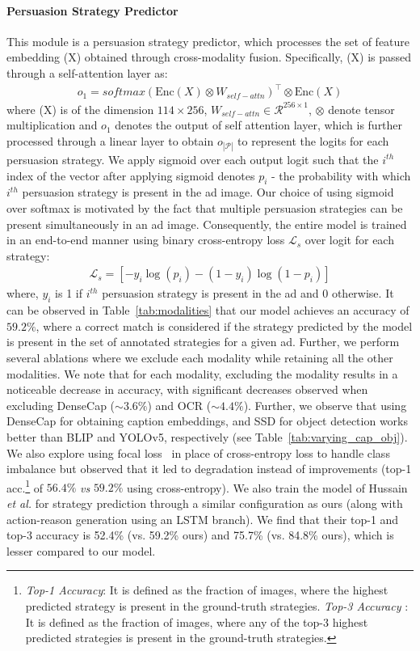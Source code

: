 \paragraph{Persuasion Strategy Predictor} 
This module is a persuasion strategy predictor, which processes the set of feature embedding (X) obtained through cross-modality fusion. Specifically, (X) is passed through a self-attention layer as:
\begin{align}
o_{1} = softmax(\text{Enc}(X) \otimes W_{self-attn})^\intercal \otimes \text{Enc}(X)
\end{align}
where (X) is of the dimension $114\times256$,  $W_{self-attn} \in \mathcal{R}^{256 \times 1}$, $\otimes$ denote tensor multiplication and $o_1$ denotes the output of self attention layer, which is further processed through a linear layer to obtain $o_{|\mathcal{P}|}$ to represent the logits for each persuasion strategy. We apply sigmoid over each output logit such that the $i^{th}$ index of the vector after applying sigmoid denotes $p_i$ - the probability with which $i^{th}$ persuasion strategy is present in the ad image. Our choice of using sigmoid over softmax is motivated by the fact that multiple persuasion strategies can be present simultaneously in an ad image. Consequently, the entire model is trained in an end-to-end manner using binary cross-entropy loss $\mathcal{L}_{s}$ over logit for each strategy:
\begin{align}
        \mathcal{L}_{s} = \left[-y_i \log(p_i) - (1-y_i) \log(1 - p_i) \right]
\end{align}
where, $y_i$ is 1 if $i^{th}$ persuasion strategy is present in the ad and 0 otherwise. It can be observed in Table~\ref{tab:modalities} that our model achieves an accuracy of $59.2\%$, where a correct match is considered if the strategy predicted by the model is present in the set of annotated strategies for a given ad. Further, we perform several ablations where we exclude each modality while retaining all the other modalities. We note that for each modality, excluding the modality results in a noticeable decrease in accuracy, with significant decreases observed when excluding DenseCap ($\sim3.6\%$) and OCR ($\sim4.4\%$). Further, we observe that using DenseCap for obtaining caption embeddings, and SSD for object detection works better than BLIP and YOLOv5, respectively (see Table~\ref{tab:varying_cap_obj}). We also explore using focal loss~\cite{lin2017focal} in place of cross-entropy loss to handle class imbalance but observed that it led to degradation instead of improvements (top-1 acc.\footnote{\textit{Top-1 Accuracy}: It is defined as the fraction of images, where the highest predicted strategy is present in the ground-truth strategies. \textit{Top-3 Accuracy} : It is defined as the fraction of images, where any of the top-3 highest predicted strategies is present in the ground-truth strategies.} of $56.4\%$ \textit{vs} $59.2\%$ using cross-entropy). We also train the model of Hussain \textit{et al.} \cite{hussain2017automatic} for strategy prediction through a similar configuration as ours (along with action-reason generation using an LSTM branch). We find that their top-1 and top-3 accuracy is 52.4\% (vs. 59.2\% ours) and 75.7\% (vs. 84.8\% ours), which is lesser compared to our model.

